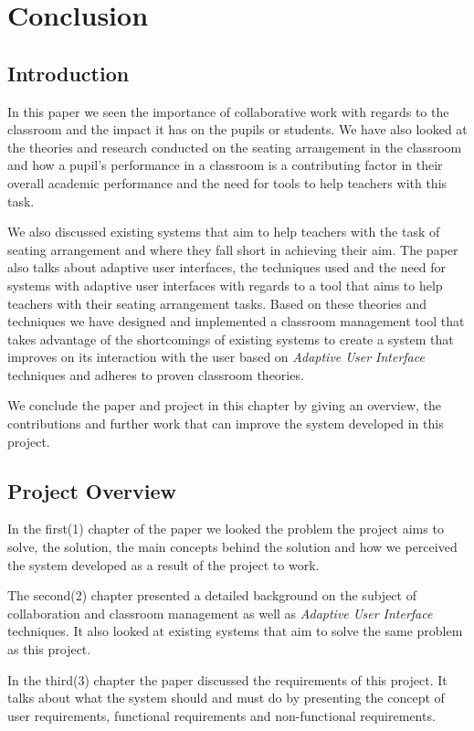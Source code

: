 \section{Conclusion}
\subsection{Introduction}
 In this paper we seen the importance of collaborative work with regards to the classroom and the impact it has on the pupils or students. We have also looked at the theories and research conducted on the seating arrangement in the classroom and how a pupil's performance in a classroom is a contributing factor in their overall academic performance and the need for tools to help teachers with this task.

We also discussed existing systems that aim to help teachers with the task of seating arrangement and where they fall short in achieving their aim. The paper also talks about adaptive user interfaces, the techniques used and the need for systems with adaptive user interfaces with regards to a tool that aims to help teachers with their seating arrangement tasks. Based on these theories and techniques we have designed and implemented a classroom management tool that takes advantage of the shortcomings of existing systems to create a system that improves on its interaction with the user based on \emph{Adaptive User Interface} techniques and adheres to proven classroom theories.

We conclude the paper and project in this chapter by giving an overview, the contributions and further work that can improve the system developed in this project.
\subsection{Project Overview}
 In the first(1) chapter of the paper we looked the problem the project aims to solve, the solution, the main concepts behind the solution and how we perceived the system developed as a result of the project to work.
 
 The second(2) chapter presented a detailed background on the subject of collaboration and classroom management as well as \emph{Adaptive User Interface} techniques. It also looked at existing systems that aim to solve the same problem as this project.
 
 In the third(3) chapter the paper discussed the requirements of this project. It talks about what the system should and must do by presenting the concept of user requirements, functional requirements and non-functional requirements.
 
